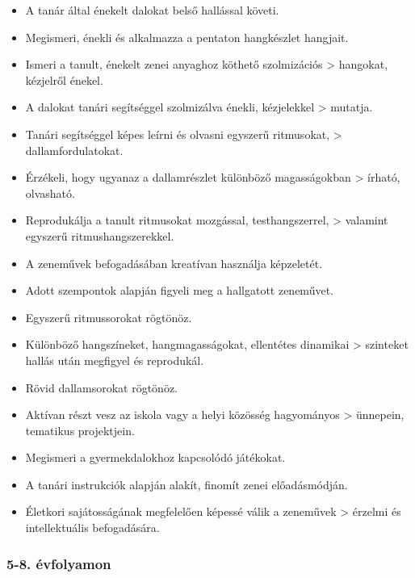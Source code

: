 \begin{itemize}
\item
  A tanár által énekelt dalokat belső hallással követi.
\item
  Megismeri, énekli és alkalmazza a pentaton hangkészlet hangjait.
\item
  Ismeri a tanult, énekelt zenei anyaghoz köthető szolmizációs
  \textgreater{} hangokat, kézjelről énekel.
\item
  A dalokat tanári segítséggel szolmizálva énekli, kézjelekkel
  \textgreater{} mutatja.
\item
  Tanári segítséggel képes leírni és olvasni egyszerű ritmusokat,
  \textgreater{} dallamfordulatokat.
\item
  Érzékeli, hogy ugyanaz a dallamrészlet különböző magasságokban
  \textgreater{} írható, olvasható.
\item
  Reprodukálja a tanult ritmusokat mozgással, testhangszerrel,
  \textgreater{} valamint egyszerű ritmushangszerekkel.
\item
  A zeneművek befogadásában kreatívan használja képzeletét.
\item
  Adott szempontok alapján figyeli meg a hallgatott zeneművet.
\item
  Egyszerű ritmussorokat rögtönöz.
\item
  Különböző hangszíneket, hangmagasságokat, ellentétes dinamikai
  \textgreater{} szinteket hallás után megfigyel és reprodukál.
\item
  Rövid dallamsorokat rögtönöz.
\item
  Aktívan részt vesz az iskola vagy a helyi közösség hagyományos
  \textgreater{} ünnepein, tematikus projektjein.
\item
  Megismeri a gyermekdalokhoz kapcsolódó játékokat.
\item
  A tanári instrukciók alapján alakít, finomít zenei előadásmódján.
\item
  Életkori sajátosságának megfelelően képessé válik a zeneművek
  \textgreater{} érzelmi és intellektuális befogadására.
\end{itemize}

\hypertarget{evfolyamon-12}{%
\subsubsection{5-8. évfolyamon}\label{evfolyamon-12}}

